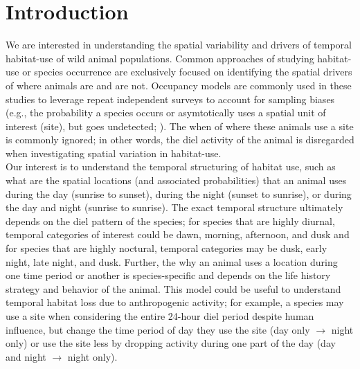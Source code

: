 \documentclass[12pt]{article}
\begin{document}
\setlength{\abovedisplayskip}{-2pt}
\setlength{\belowdisplayskip}{10pt}
\setlength{\abovedisplayshortskip}{0pt}
\setlength{\belowdisplayshortskip}{10pt}
\maketitle


\section{Introduction}
We are interested in understanding the spatial variability and drivers of temporal habitat-use of wild animal populations. Common approaches of studying habitat-use or species occurrence are exclusively focused on identifying the spatial drivers of where animals are and are not. Occupancy models are commonly used in these studies to leverage repeat independent surveys to account for sampling biases (e.g., the probability a species occurs or asymtotically uses a spatial unit of interest (site), but goes undetected; \citealt{occupancybook}). The when of where these animals use a site is commonly ignored; in other words, the diel activity of the animal is disregarded when investigating spatial variation in habitat-use. \\

Our interest is to understand the temporal structuring of habitat use, such as what are the spatial locations (and associated probabilities) that an animal uses during the day (sunrise to sunset), during the night (sunset to sunrise), or during the day and night (sunrise to sunrise). The exact temporal structure ultimately depends on the diel pattern of the species; for species that are highly diurnal, temporal categories of interest could be dawn, morning, afternoon, and dusk and for species that are highly noctural, temporal categories may be dusk, early night, late night, and dusk. Further, the why an animal uses a location during one time period or another is species-specific and depends on the life history strategy and behavior of the animal. This model could be useful to understand temporal habitat loss due to anthropogenic activity; for example, a species may use a site when considering the entire 24-hour diel period despite human influence, but change the time period of day they use the site (day only $\rightarrow$ night only) or use the site less by dropping activity during one part of the day (day and night $\rightarrow$ night only). \\
\end{document}
